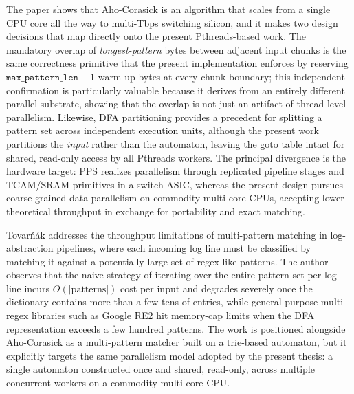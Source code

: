 The paper shows that Aho-Corasick is an algorithm that scales from a single CPU core all the way to multi-Tbps switching silicon, and it makes two design decisions that map directly onto the present Pthreads-based work. The mandatory overlap of \emph{longest-pattern} bytes between adjacent input chunks is the same correctness primitive that the present implementation enforces by reserving $\texttt{max\_pattern\_len}-1$ warm-up bytes at every chunk boundary; this independent confirmation is particularly valuable because it derives from an entirely different parallel substrate, showing that the overlap is not just an artifact of thread-level parallelism. Likewise, DFA partitioning provides a precedent for splitting a pattern set across independent execution units, although the present work partitions the \emph{input} rather than the automaton, leaving the goto table intact for shared, read-only access by all Pthreads workers. The principal divergence is the hardware target: PPS realizes parallelism through replicated pipeline stages and TCAM/SRAM primitives in a switch ASIC, whereas the present design pursues coarse-grained data parallelism on commodity multi-core CPUs, accepting lower theoretical throughput in exchange for portability and exact matching.


Tovar{\v{n}}ák \cite{Tovarnak2016REtrie} addresses the throughput limitations of multi-pattern matching in log-abstraction pipelines, where each incoming log line must be classified by matching it against a potentially large set of regex-like patterns. The author observes that the naive strategy of iterating over the entire pattern set per log line incurs $O(|\text{patterns}|)$ cost per input and degrades severely once the dictionary contains more than a few tens of entries, while general-purpose multi-regex libraries such as Google RE2 hit memory-cap limits when the DFA representation exceeds a few hundred patterns. The work is positioned alongside Aho-Corasick as a multi-pattern matcher built on a trie-based automaton, but it explicitly targets the same parallelism model adopted by the present thesis: a single automaton constructed once and shared, read-only, across multiple concurrent workers on a commodity multi-core CPU.

